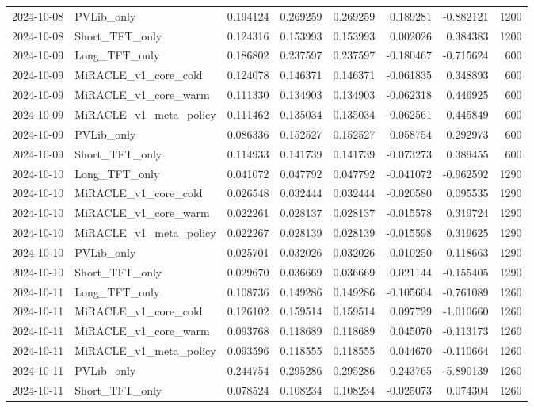 \begin{tabular}{llrrrrrr}
2024-10-08 & PVLib_only & 0.194124 & 0.269259 & 0.269259 & 0.189281 & -0.882121 & 1200 \\
2024-10-08 & Short_TFT_only & 0.124316 & 0.153993 & 0.153993 & 0.002026 & 0.384383 & 1200 \\
2024-10-09 & Long_TFT_only & 0.186802 & 0.237597 & 0.237597 & -0.180467 & -0.715624 & 600 \\
2024-10-09 & MiRACLE_v1_core_cold & 0.124078 & 0.146371 & 0.146371 & -0.061835 & 0.348893 & 600 \\
2024-10-09 & MiRACLE_v1_core_warm & 0.111330 & 0.134903 & 0.134903 & -0.062318 & 0.446925 & 600 \\
2024-10-09 & MiRACLE_v1_meta_policy & 0.111462 & 0.135034 & 0.135034 & -0.062561 & 0.445849 & 600 \\
2024-10-09 & PVLib_only & 0.086336 & 0.152527 & 0.152527 & 0.058754 & 0.292973 & 600 \\
2024-10-09 & Short_TFT_only & 0.114933 & 0.141739 & 0.141739 & -0.073273 & 0.389455 & 600 \\
2024-10-10 & Long_TFT_only & 0.041072 & 0.047792 & 0.047792 & -0.041072 & -0.962592 & 1290 \\
2024-10-10 & MiRACLE_v1_core_cold & 0.026548 & 0.032444 & 0.032444 & -0.020580 & 0.095535 & 1290 \\
2024-10-10 & MiRACLE_v1_core_warm & 0.022261 & 0.028137 & 0.028137 & -0.015578 & 0.319724 & 1290 \\
2024-10-10 & MiRACLE_v1_meta_policy & 0.022267 & 0.028139 & 0.028139 & -0.015598 & 0.319625 & 1290 \\
2024-10-10 & PVLib_only & 0.025701 & 0.032026 & 0.032026 & -0.010250 & 0.118663 & 1290 \\
2024-10-10 & Short_TFT_only & 0.029670 & 0.036669 & 0.036669 & 0.021144 & -0.155405 & 1290 \\
2024-10-11 & Long_TFT_only & 0.108736 & 0.149286 & 0.149286 & -0.105604 & -0.761089 & 1260 \\
2024-10-11 & MiRACLE_v1_core_cold & 0.126102 & 0.159514 & 0.159514 & 0.097729 & -1.010660 & 1260 \\
2024-10-11 & MiRACLE_v1_core_warm & 0.093768 & 0.118689 & 0.118689 & 0.045070 & -0.113173 & 1260 \\
2024-10-11 & MiRACLE_v1_meta_policy & 0.093596 & 0.118555 & 0.118555 & 0.044670 & -0.110664 & 1260 \\
2024-10-11 & PVLib_only & 0.244754 & 0.295286 & 0.295286 & 0.243765 & -5.890139 & 1260 \\
2024-10-11 & Short_TFT_only & 0.078524 & 0.108234 & 0.108234 & -0.025073 & 0.074304 & 1260 \\

\end{tabular}
